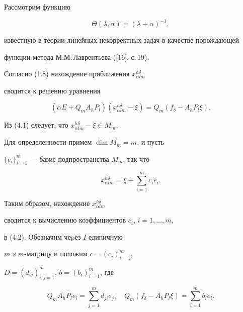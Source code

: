 \begin{exam} 


Рассмотрим функцию


$$


\Theta(\lambda, \alpha)={(\lambda + \alpha )}^{-1},


$$


известную в теории линейных некорректных задач в качестве порождающей


функции метода М.М.\,Лаврентьева ([16], с.\,19).


Согласно (1.8) нахождение приближения $x_{\alpha l m}^{h \delta}$


сводится к решению уравнения


\begin{equation}


(\alpha E + Q_m A_h P_l) (x_{\alpha l m}^{h \delta} - \xi )=


Q_m(f_{\delta}- A_h P_l \xi).


\tag{4.1}


\end{equation}


Из (4.1) следует, что $x_{\alpha l m}^{h \delta}- \xi \in M_m$.


Для определенности примем $\dim M_m=m$, и пусть


$\{ e_i \}_{i=1}^m$ --- базис подпространства $M_m$, так что


\begin{equation}


x_{\alpha l m}^{h \delta}= \xi + \sum_{i=1}^m c_i e_i.


\tag{4.2}


\end{equation}


Таким образом, нахождение $x_{\alpha l m}^{h \delta}$


сводится к вычислению коэффициентов $c_i$, $i=1,\dotsc,m$,


в (4.2). Обозначим чеpез $I$ единичную


$m \times m$-матрицу и положим $c=(c_i)_{i=1}^m$,


$D=(d_{ij})_{i,j=1}^m$, $b=(b_i)_{i=1}^m$, где


\begin{equation}


Q_m A_h P_l e_i = \sum_{j=1}^m d_{ji} e_j, \quad


Q_m(f_{\delta} - A_h P_l \xi)= \sum_{i=1}^m b_i e_i.


\tag{4.3}


\end{equation}



\end{exam}
